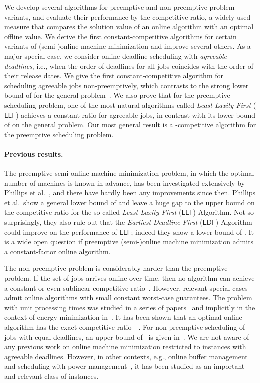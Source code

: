 \documentclass[letterpaper,11pt]{article}
\newcommand{\EDF}{\ensuremath{\mathsf{EDF}}\xspace}
\newcommand{\LLF}{\ensuremath{\mathsf{LLF}}\xspace}
\begin{document}
We develop several algorithms for preemptive and non-preemptive problem variants, and evaluate
their performance by  the competitive ratio, a widely-used measure that
compares the solution value of an online algorithm with an optimal
offline value. We derive the first constant-competitive 
algorithms for certain variants of (semi-)online machine minimization
and improve several others. As a major special case, we consider online deadline
scheduling with {\em agreeable deadlines}, i.e., when the order of deadlines for all jobs coincides with the order of
their release dates.  We give the first constant-competitive algorithm for scheduling agreeable jobs non-preemptively,
which contrasts to the strong lower bound of  for the general
problem~\cite{Saha13}. We also prove that for the preemptive scheduling problem, one of the most natural algorithms called {\em Least Laxity First} (\LLF) achieves a constant ratio for agreeable jobs, in contrast with its lower bound of  on the general problem.
Our most general result is a -competitive algorithm for the preemptive scheduling problem.

\paragraph{Previous results.} The preemptive semi-online machine minimization problem, in which the
optimal number of machines is known in advance, has been
investigated extensively by Phillips et al.~\cite{phillipsSTW02}, and there have
hardly been any improvements since then. Phillips et al.\ show a
general lower bound of  and leave a huge gap to the
upper bound  on the competitive
ratio for the so-called {\em Least Laxity First} 
(\LLF) Algorithm. Not so surprisingly, they also rule out that the {\em Earliest Deadline
  First} (\EDF) Algorithm could improve on the performance of \LLF;
indeed they show a lower bound of
. It is a wide open question if
preemptive (semi-)online machine minimization admits a constant-factor
online algorithm.

The non-preemptive problem is considerably harder than the preemptive
problem. If the set of jobs arrives online over time, then no algorithm
can achieve a constant or even sublinear competitive ratio~\cite{Saha13}. However, relevant special cases admit
online algorithms with small constant worst-case guarantees. The
problem with unit processing times was studied in a series of
papers~\cite{KleywegtNST99,ShiY08,KaoCRW12,Saha13,DevanurMPY14} and implicitly in
the context of energy-minimization in~\cite{BansalKP07}. It has been shown that an optimal online
algorithm has the exact competitive ratio~~\cite{BansalKP07,DevanurMPY14}. For non-preemptive scheduling of
jobs with equal deadlines, an upper bound of~ is given
in~\cite{DevanurMPY14}. We are not aware of any previous work on
online machine minimization restricted to instances with agreeable
deadlines. However, in other contexts, e.g., online buffer management~\cite{JezLSS12} and scheduling
with power management~\cite{AlbersMS14,AngelBC14}, it has been studied
as an important and relevant class of instances.
\end{document}
